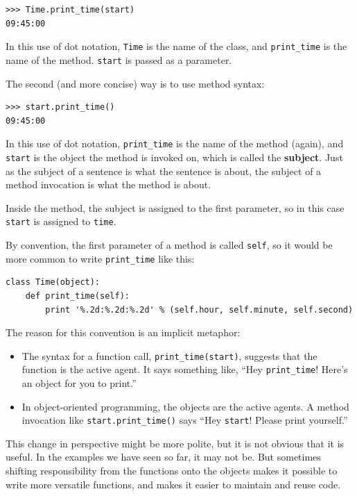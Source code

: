 \documentclass[10pt]{book}
\begin{document}
\begin{verbatim}
>>> Time.print_time(start)
09:45:00
\end{verbatim}
%
In this use of dot notation, {\tt Time} is the name of the class,
and \verb"print_time" is the name of the method.  {\tt start} is
passed as a parameter.

The second (and more concise) way is to use method syntax:

\begin{verbatim}
>>> start.print_time()
09:45:00
\end{verbatim}
%
In this use of dot notation, \verb"print_time" is the name of the
method (again), and {\tt start} is the object the method is
invoked on, which is called the {\bf subject}.  Just as the
subject of a sentence is what the sentence is about, the subject
of a method invocation is what the method is about.

Inside the method, the subject is assigned to the first
parameter, so in this case {\tt start} is assigned
to {\tt time}.

By convention, the first parameter of a method is
called {\tt self}, so it would be more common to write
\verb"print_time" like this:

\begin{verbatim}
class Time(object):
    def print_time(self):
        print '%.2d:%.2d:%.2d' % (self.hour, self.minute, self.second)
\end{verbatim}
%
The reason for this convention is an implicit metaphor:

\begin{itemize}

\item The syntax for a function call, \verb"print_time(start)",
  suggests that the function is the active agent.  It says something
  like, ``Hey \verb"print_time"!  Here's an object for you to print.''

\item In object-oriented programming, the objects are the active
  agents.  A method invocation like \verb"start.print_time()" says
  ``Hey {\tt start}!  Please print yourself.''

\end{itemize}

This change in perspective might be more polite, but it is not obvious
that it is useful.  In the examples we have seen so far, it may not
be.  But sometimes shifting responsibility from the functions onto the
objects makes it possible to write more versatile functions, and makes
it easier to maintain and reuse code.
\end{document}
